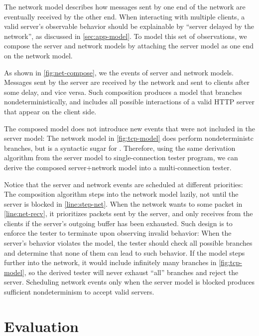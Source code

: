 The network model describes how messages sent by one end of the network are
eventually received by the other end.  When interacting with multiple clients, a
valid server's observable behavior should be explainable by ``server delayed by the
network'', as discussed in \autoref{sec:app-model}.  To model this set of
observations, we compose the server and network models by attaching the server
model as one end on the network model.

As shown in \autoref{fig:net-compose}, we  the events of server and
network
models.  Messages sent by the server are received by the network and sent to clients after some
delay, and vice versa.  Such composition produces a model that branches
nondeterministically, and includes all possible interactions of a valid HTTP
server that appear on the client side.

The composed model does not introduce new events that were not included in the server model:
The network model in \autoref{fig:tcp-model} does perform nondeterministc 
branches, but  is a syntactic sugar for .
Therefore, using the same derivation algorithm from the server model to
single-connection tester program, we can derive the composed server+network model into a
multi-connection tester.

Notice that the server and network events are scheduled at different priorities: The
composition algorithm steps into the network model lazily, not until the
server is blocked in \autoref{line:step-net}.  When the network wants to
 some packet in \autoref{line:net-recv}, it prioritizes packets sent
by the server, and only receives from the clients if the server's
outgoing buffer has been exhausted.  Such design is to enforce the tester to
terminate upon observing invalid behavior: When the server's behavior violates
the model, the tester should check all possible branches and determine that none
of them can lead to such behavior.  If the model steps further into the network, it would
include infinitely many  branches in \autoref{fig:tcp-model}, so the
derived tester will never exhaust ``all'' branches and reject the server.
Scheduling network events only when the server model is blocked produces sufficient nondeterminism to
accept valid servers.

\section{Evaluation}
\label{sec:eval}


